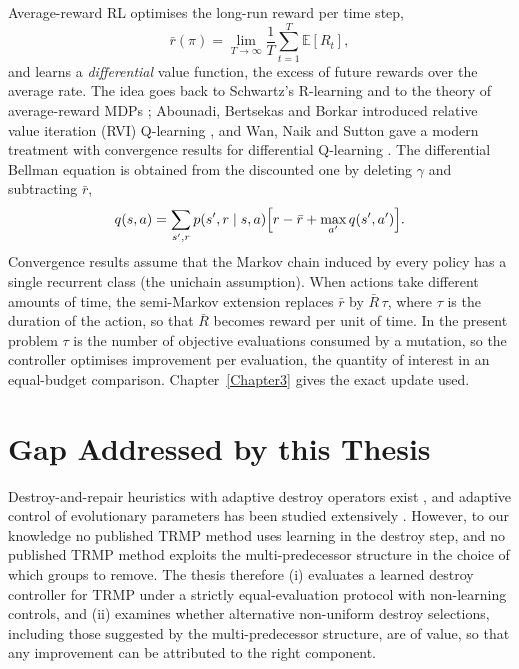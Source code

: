 Average-reward RL optimises the long-run reward per time step,
\begin{equation}
\bar r(\pi)=\lim_{T\to\infty}\frac1T\sum_{t=1}^{T}\mathbb E[R_t],
\end{equation}
and learns a \emph{differential} value function, the excess of future rewards over the average rate. The idea goes back to Schwartz's R-learning \cite{schwartz1993} and to the theory of average-reward MDPs \cite{puterman1994}; Abounadi, Bertsekas and Borkar introduced relative value iteration (RVI) Q-learning \cite{abounadi2001}, and Wan, Naik and Sutton gave a modern treatment with convergence results for differential Q-learning \cite{wan2021}. The differential Bellman equation is obtained from the discounted one by deleting $\gamma$ and subtracting $\bar r$,
\begin{equation}
q(s,a)=\sum_{s',r}p(s',r\mid s,a)\Bigl[r-\bar r+\max_{a'}q(s',a')\Bigr].
\end{equation}
Convergence results assume that the Markov chain induced by every policy has a single recurrent class (the unichain assumption). When actions take different amounts of time, the semi-Markov extension replaces $\bar r$ by $\bar R\,\tau$, where $\tau$ is the duration of the action, so that $\bar R$ becomes reward per unit of time. In the present problem $\tau$ is the number of objective evaluations consumed by a mutation, so the controller optimises improvement per evaluation, the quantity of interest in an equal-budget comparison. Chapter~\ref{Chapter3} gives the exact update used.


\section{Gap Addressed by this Thesis}\label{sec:lit-gap}

Destroy-and-repair heuristics with adaptive destroy operators exist \cite{ropke2006}, and adaptive control of evolutionary parameters has been studied extensively \cite{karafotias2015}. However, to our knowledge no published TRMP method uses learning in the destroy step, and no published TRMP method exploits the multi-predecessor structure in the choice of which groups to remove. The thesis therefore (i) evaluates a learned destroy controller for TRMP under a strictly equal-evaluation protocol with non-learning controls, and (ii) examines whether alternative non-uniform destroy selections, including those suggested by the multi-predecessor structure, are of value, so that any improvement can be attributed to the right component.
